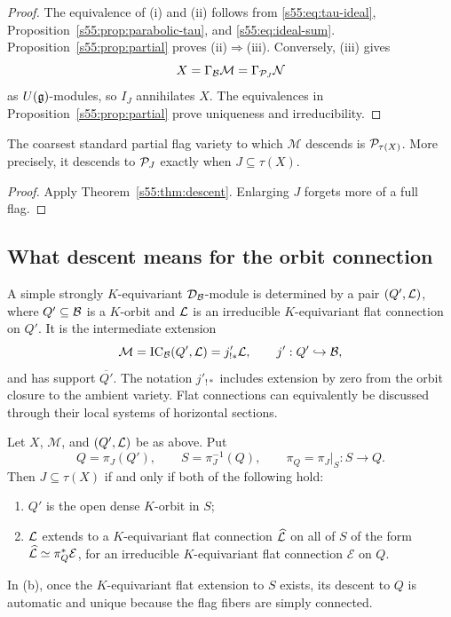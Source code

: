 \begin{proof}
The equivalence of (i) and (ii) follows from
\eqref{s55:eq:tau-ideal}, Proposition~\ref{s55:prop:parabolic-tau}, and
\eqref{s55:eq:ideal-sum}. Proposition~\ref{s55:prop:partial} proves (ii)$\Rightarrow$(iii).
Conversely, (iii) gives
\[
 X=\Gamma_{\mathcal{B}}\mathcal M
   =\Gamma_{\mathcal{P}_J}\mathcal N
\]
as $U(\mathfrak{g})$-modules, so $I_J$ annihilates $X$. The equivalences in
Proposition~\ref{s55:prop:partial} prove uniqueness and irreducibility.
\end{proof}

\begin{cor}
\label{s55:cor:coarsest}
The coarsest standard partial flag variety to which $\mathcal M$ descends
is $\mathcal{P}_{\tau(X)}$. More precisely, it descends to $\mathcal{P}_J$ exactly when
$J\subseteq\tau(X)$.
\end{cor}

\begin{proof}
Apply Theorem~\ref{s55:thm:descent}. Enlarging $J$ forgets more of a full flag.
\end{proof}

\subsection{What descent means for the orbit connection}

A simple strongly $K$-equivariant $\mathcal D_{\mathcal{B}}$-module is determined
by a pair $(Q',\mathcal{L})$, where $Q'\subseteq\mathcal{B}$ is a $K$-orbit and $\mathcal{L}$ is
an irreducible $K$-equivariant flat connection on $Q'$. It is the
intermediate extension
\[
 \mathcal M=\operatorname{IC}_{\mathcal{B}}(Q',\mathcal{L})=j'_{!*}\mathcal{L},
 \qquad j':Q'\hookrightarrow\mathcal{B},
\]
and has support $\overline{Q'}$. The notation $j'_{!*}$ includes extension
by zero from the orbit closure to the ambient variety. Flat connections
can equivalently be discussed through their local systems of horizontal
sections.

\begin{prop}
\label{s55:prop:orbit}
Let $X$, $\mathcal M$, and $(Q',\mathcal{L})$ be as above. Put
\[
 Q=\pi_J(Q'),\qquad S=\pi_J^{-1}(Q),\qquad
 \pi_Q=\pi_J|_S:S\longrightarrow Q.
\]
Then $J\subseteq\tau(X)$ if and only if both of the following hold:
\begin{enumerate}
\renewcommand{\labelenumi}{\textup{(\alph{enumi})}}
 \item $Q'$ is the open dense $K$-orbit in $S$;
 \item $\mathcal{L}$ extends to a $K$-equivariant flat connection $\widehat{\mathcal{L}}$ on all of $S$
       of the form $\widehat{\mathcal{L}}\simeq\pi_Q^*\mathcal E$, for an irreducible
       $K$-equivariant flat connection $\mathcal E$ on $Q$.
\end{enumerate}
In (b), once the $K$-equivariant flat extension to $S$ exists, its descent to $Q$ is
automatic and unique because the flag fibers are simply connected.
\end{prop}

